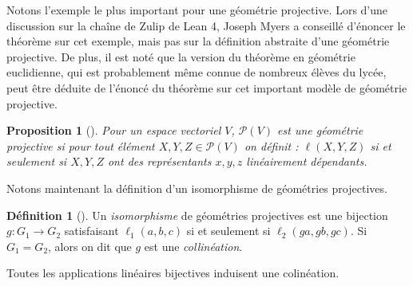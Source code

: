 \documentclass[12pt, oneside]{memoir}
\newtheorem{prop}{Proposition}
\theoremstyle{definition}
\newtheorem{defn}{Définition}
\theoremstyle{remark}
\newcommand{\proj}{\boldsymbol{\mathscr{P}}}
\begin{document}
Notons l'exemple le plus important pour une géométrie projective. Lors
d'une discussion sur la chaîne de Zulip de Lean 4, Joseph Myers a
conseillé d'énoncer le théorème sur cet exemple, mais pas sur la
définition abstraite d'une géométrie projective. De plus, il est noté
que la version du théorème en géométrie euclidienne, qui est
probablement même connue de nombreux élèves du lycée, peut être
déduite de l'énoncé du théorème sur cet important modèle de géométrie
projective.
\begin{prop}[{\cite[27]{ff00}}]
  \label{example}
  Pour un espace vectoriel $V$, $\proj(V)$ est une géométrie
  projective si pour tout élément $X, Y, Z \in \proj(V)$ on définit :
  $\ell(X,Y,Z)$ si et seulement si $X, Y, Z$ ont des représentants
  $x, y, z$ linéairement dépendants.
\end{prop}
Notons maintenant la définition d'un isomorphisme de géométries
projectives.
\begin{defn}[{\cite[27]{ff00}}]
  Un \textit{isomorphisme} de géométries projectives est une bijection
  $g: G_1 \to G_2$ satisfaisant $\ell_1(a,b,c)$ si et seulement si
  $\ell_2(ga,gb,gc)$. Si $G_1 = G_2$, alors on dit que $g$ est une
  \textit{collinéation}.
\end{defn}
Toutes les applications linéaires bijectives induisent une
colinéation.
\end{document}
